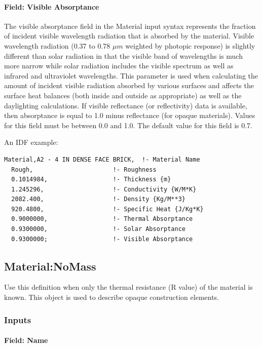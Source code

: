 \paragraph{Field: Visible Absorptance}\label{field-visible-absorptance}

The visible absorptance field in the Material input syntax represents the fraction of incident visible wavelength radiation that is absorbed by the material. Visible wavelength radiation (0.37 to 0.78 $\mu{}m$ weighted by photopic response) is slightly different than solar radiation in that the visible band of wavelengths is much more narrow while solar radiation includes the visible spectrum as well as infrared and ultraviolet wavelengths. This parameter is used when calculating the amount of incident visible radiation absorbed by various surfaces and affects the surface heat balances (both inside and outside as appropriate) as well as the daylighting calculations. If visible reflectance (or reflectivity) data is available, then absorptance is equal to 1.0 minus reflectance (for opaque materials). Values for this field must be between 0.0 and 1.0. The default value for this field is 0.7.

An IDF example:

\begin{lstlisting}
Material,A2 - 4 IN DENSE FACE BRICK,  !- Material Name
  Rough,                      !- Roughness
  0.1014984,                  !- Thickness {m}
  1.245296,                   !- Conductivity {W/M*K}
  2082.400,                   !- Density {Kg/M**3}
  920.4800,                   !- Specific Heat {J/Kg*K}
  0.9000000,                  !- Thermal Absorptance
  0.9300000,                  !- Solar Absorptance
  0.9300000;                  !- Visible Absorptance
\end{lstlisting}

\subsection{Material:NoMass}\label{materialnomass}

Use this definition when only the thermal resistance (R value) of the material is known. This object is used to describe opaque construction elements.

\subsubsection{Inputs}\label{inputs-1-043}

\paragraph{Field: Name}\label{field-name-1-042}


